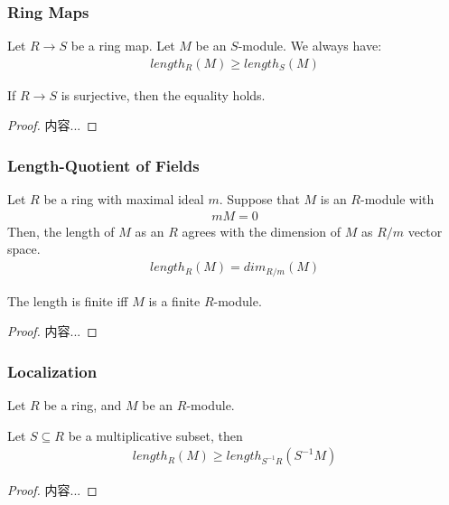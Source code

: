 \documentclass[Total.tex]{subfiles}
\begin{document}
		\subsubsection{Ring Maps}
		
		\begin{lemma}
			Let $R\rightarrow S$ be a ring map. Let $M$ be an $S$-module. We always have:
			\begin{gather*}
				length_R(M)\geq length_S(M)
			\end{gather*}
			
			If $R\rightarrow S$ is surjective, then the equality holds.
		\end{lemma}
		
		\begin{proof}
			内容...
		\end{proof}
		
		\subsubsection{Length-Quotient of Fields}
		\begin{lemma}
			Let $R$ be a ring with maximal ideal $m$. Suppose that $M$ is an $R$-module with
			\begin{gather*}
				mM=0
			\end{gather*}
			Then, the length of $M$ as an $R$ agrees with the dimension of $M$ as $R/m$ vector space.
			\begin{gather*}
				length_R(M)=dim_{R/m}(M)
			\end{gather*}
			
			The length is finite iff $M$ is a finite $R$-module.
		\end{lemma}
		\begin{proof}
			内容...
		\end{proof}
		\subsubsection{Localization}
		
		\begin{lemma}
				Let $R$ be a ring, and $M$ be an $R$-module.
				
				Let $S\subseteq R$ be a multiplicative subset, then
				\begin{gather*}
					length_R(M)\geq length_{S^{-1}R}(S^{-1}M)
				\end{gather*}
		\end{lemma}
		\begin{proof}
			内容...
		\end{proof}
		
\end{document}
